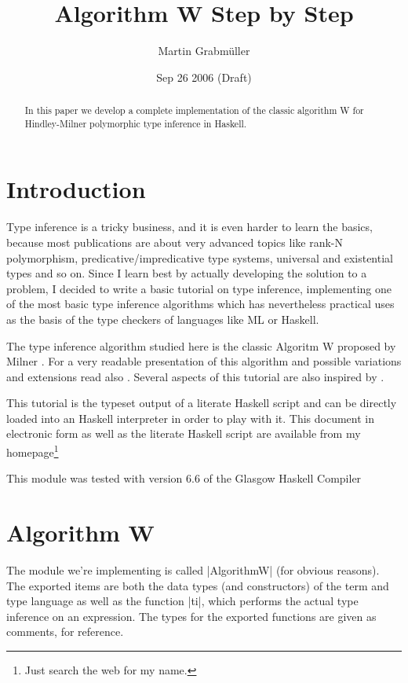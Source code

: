 \documentclass[a4paper,11pt]{article}
\title{\bf Algorithm W Step by Step}
\author{Martin Grabm{\"u}ller}
\date{Sep 26 2006 (Draft)}
\begin{document}
\maketitle

\begin{abstract}\noindent
In this paper we develop a complete implementation of the classic
algorithm W for Hindley-Milner polymorphic type inference in Haskell.
\end{abstract}

\section{Introduction}

Type inference is a tricky business, and it is even harder to learn
the basics, because most publications are about very advanced topics
like rank-N polymorphism, predicative/impredicative type systems,
universal and existential types and so on.  Since I learn best by
actually developing the solution to a problem, I decided to write a
basic tutorial on type inference, implementing one of the most basic
type inference algorithms which has nevertheless practical uses as the
basis of the type checkers of languages like ML or Haskell.

The type inference algorithm studied here is the classic Algoritm W
proposed by Milner \cite{Milner1978Theory}.  For a very readable
presentation of this algorithm and possible variations and extensions
read also \cite{Heeren2002GeneralizingHM}.  Several aspects of this
tutorial are also inspired by \cite{Jones1999THiH}.

This tutorial is the typeset output of a literate Haskell script and
can be directly loaded into an Haskell interpreter in order to play
with it.  This document in electronic form as well as the literate
Haskell script are available from my homepage\footnote{Just search the
web for my name.}

This module was tested with version 6.6 of the Glasgow Haskell
Compiler \cite{GHC2006GHCHomepage}

\section{Algorithm W}

The module we're implementing is called |AlgorithmW| (for obvious
reasons).  The exported items are both the data types (and
constructors) of the term and type language as well as the function
|ti|, which performs the actual type inference on an expression.  The
types for the exported functions are given as comments, for reference.
\end{document}

